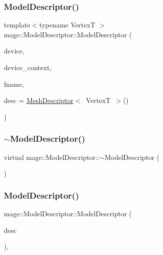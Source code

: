\subsubsection{\texorpdfstring{Model\+Descriptor()}{ModelDescriptor()}\hspace{0.1cm}{\footnotesize\ttfamily [1/3]}}
{\footnotesize\ttfamily template$<$typename VertexT $>$ \\
mage\+::\+Model\+Descriptor\+::\+Model\+Descriptor (\begin{DoxyParamCaption}\item[{I\+D3\+D11\+Device2 $\ast$}]{device,  }\item[{I\+D3\+D11\+Device\+Context2 $\ast$}]{device\+\_\+context,  }\item[{const wstring \&}]{fname,  }\item[{const \hyperlink{structmage_1_1_mesh_descriptor}{Mesh\+Descriptor}$<$ VertexT $>$ \&}]{desc = {\ttfamily \hyperlink{structmage_1_1_mesh_descriptor}{Mesh\+Descriptor}$<$~VertexT~$>$()} }\end{DoxyParamCaption})}

\hypertarget{classmage_1_1_model_descriptor_a3bc8ee3d1cb8d2675374727edce3d593}{}\label{classmage_1_1_model_descriptor_a3bc8ee3d1cb8d2675374727edce3d593} 
\subsubsection{\texorpdfstring{$\sim$\+Model\+Descriptor()}{~ModelDescriptor()}}
{\footnotesize\ttfamily virtual mage\+::\+Model\+Descriptor\+::$\sim$\+Model\+Descriptor (\begin{DoxyParamCaption}{ }\end{DoxyParamCaption})\hspace{0.3cm}{\ttfamily [virtual]}}

\hypertarget{classmage_1_1_model_descriptor_af44185efc20e10ede762d29bc454c5f3}{}\label{classmage_1_1_model_descriptor_af44185efc20e10ede762d29bc454c5f3} 
\subsubsection{\texorpdfstring{Model\+Descriptor()}{ModelDescriptor()}\hspace{0.1cm}{\footnotesize\ttfamily [2/3]}}
{\footnotesize\ttfamily mage\+::\+Model\+Descriptor\+::\+Model\+Descriptor (\begin{DoxyParamCaption}\item[{const \hyperlink{classmage_1_1_model_descriptor}{Model\+Descriptor} \&}]{desc }\end{DoxyParamCaption})\hspace{0.3cm}{\ttfamily [private]}, {\ttfamily [delete]}}


